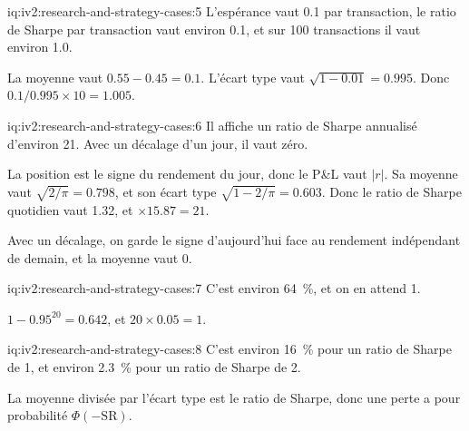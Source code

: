 \begin{solution}{iq:iv2:research-and-strategy-cases:5}
L'espérance vaut 0.1 par transaction, le ratio de Sharpe par transaction vaut environ 0.1, et sur 100 transactions il vaut environ 1.0.

La moyenne vaut $0.55 - 0.45 = 0.1$. L'écart type vaut $\sqrt{1 - 0.01} = 0.995$. Donc $0.1/0.995 \times 10 = 1.005$.

\end{solution}

\begin{solution}{iq:iv2:research-and-strategy-cases:6}
Il affiche un ratio de Sharpe annualisé d'environ 21. Avec un décalage d'un jour, il vaut zéro.

La position est le signe du rendement du jour, donc le P\&L vaut $|r|$. Sa moyenne vaut $\sqrt{2/\pi} = 0.798$, et son écart type $\sqrt{1 - 2/\pi} = 0.603$. Donc le ratio de Sharpe quotidien vaut 1.32, et $\times 15.87 = 21$.

Avec un décalage, on garde le signe d'aujourd'hui face au rendement indépendant de demain, et la moyenne vaut 0.

\end{solution}

\begin{solution}{iq:iv2:research-and-strategy-cases:7}
C'est environ 64~\%, et on en attend 1.

$1 - 0.95^{20} = 0.642$, et $20 \times 0.05 = 1$.

\end{solution}

\begin{solution}{iq:iv2:research-and-strategy-cases:8}
C'est environ 16~\% pour un ratio de Sharpe de 1, et environ 2.3~\% pour un ratio de Sharpe de 2.

La moyenne divisée par l'écart type est le ratio de Sharpe, donc une perte a pour probabilité $\Phi(-\mathrm{SR})$.

\end{solution}

